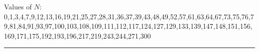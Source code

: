 \documentclass[6pt]{scrartcl}
\begin{document}
\begin{center}
\vspace{-10pt}
Values of $N$: 0,1,3,4,7,9,12,13,16,19,21,25,27,28,31,36,37,39,43,48,49,52,57,61,63,64,67,73,75,76,79,81,84,91,93,97,100,103,108,109,111,112,117,124,127,129,133,139,147,148,151,156,169,171,175,192,193,196,217,219,243,244,271,300



\end{center}
\vspace{-5pt}
\hrule
\vspace{-10pt}

\end{document}
